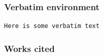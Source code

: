 \documentclass[sans,10pt]{beamer}
\begin{document}
\begin{frame}[fragile]
\frametitle{Verbatim environment}
\begin{Verbatim}[fontsize=\small, frame=single]
Here is some verbatim text
\end{Verbatim}
\end{frame}

\appendix

\begin{frame}[t] %
\frametitle{Works cited}
\begin{multicols}{2}[]
\printbibliography
\end{multicols}
\end{frame}

\end{document}
